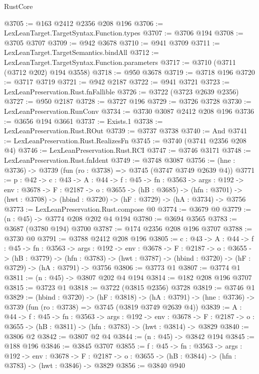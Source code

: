 \begin{lexlean}{RustCore}
\begin{coremodule}
@3705 := @163 @2412 @2356 @208 @196
@3706 := LexLeanTarget.TargetSyntax.Function.types
@3707 := @3706 @194
@3708 := @3705 @3707
@3709 := @942 @3678
@3710 := @941 @3709
@3711 := LexLeanTarget.TargetSemantics.bindAll
@3712 := LexLeanTarget.TargetSyntax.Function.parameters
@3717 := @3710 (@3711 (@3712 @202) @194 @3558)
@3718 := @950 @3678
@3719 := @3718 @196
@3720 := @3717 @3719
@3721 := @942 @2187
@3722 := @941 @3721
@3723 := LexLeanPreservation.Rust.fnFallible
@3726 := @3722 (@3723 @2639 @2356)
@3727 := @950 @2187
@3728 := @3727 @196
@3729 := @3726 @3728
@3730 := LexLeanPreservation.RunConv
@3734 := @3730 @3087 @2412 @208 @196
@3736 := @3656 @194 @3661
@3737 := Exists.{1}
@3738 := LexLeanPreservation.Rust.ROut
@3739 := @3737 @3738
@3740 := And
@3741 := LexLeanPreservation.Rust.RealizesFn
@3745 := @3740 (@3741 @2356 @208 @4)
@3746 := LexLeanPreservation.Rust.RCI
@3747 := @3746 @3171
@3748 := LexLeanPreservation.Rust.fnIdent
@3749 := @3748 @3087
@3756 := (hne : @3736) -> @3739 (fun (ro : @3738) => @3745 (@3747 @3749 @2639 @4))
@3771 := {p : @42} ->
  {c : @43} ->
  {A : @44} ->
  {f : @45} ->
  {fn : @3563} ->
  {args : @192} ->
  {env : @3678} ->
  {F : @2187} ->
  {o : @3655} ->
  (hB : @3685) ->
  (hfn : @3701) -> (hwt : @3708) -> (hbind : @3720) -> (hF : @3729) -> (hA : @3734) -> @3756
@3773 := LexLeanPreservation.Rust.compose @0
@3774 := @3679 @0
@3779 := (n : @45) -> @3774 @208 @202 @4 @194
@3780 := @3694 @3565
@3783 := @3687 (@3780 @194) @3700
@3787 := @174 @2356 @208 @196 @3707
@3788 := @3730 @0
@3791 := @3788 @2412 @208 @196
@3805 := {c : @43} ->
  {A : @44} ->
  {f : @45} ->
  {fn : @3563} ->
  {args : @192} ->
  {env : @3678} ->
  {F : @2187} ->
  {o : @3655} ->
  (hB : @3779) ->
  (hfn : @3783) -> (hwt : @3787) -> (hbind : @3720) -> (hF : @3729) -> (hA : @3791) -> @3756
@3806 := @3773 @1
@3807 := @3774 @1
@3811 := (n : @45) -> @3807 @202 @4 @194
@3814 := @182 @208 @196 @3707
@3815 := @3723 @1
@3818 := @3722 (@3815 @2356) @3728
@3819 := @3746 @1
@3829 := (hbind : @3720) ->
  (hF : @3818) ->
  (hA : @3791) -> (hne : @3736) -> @3739 (fun (ro : @3738) => @3745 (@3819 @3749 @2639 @4))
@3839 := {A : @44} ->
  {f : @45} ->
  {fn : @3563} ->
  {args : @192} ->
  {env : @3678} ->
  {F : @2187} -> {o : @3655} -> (hB : @3811) -> (hfn : @3783) -> (hwt : @3814) -> @3829
@3840 := @3806 @2
@3842 := @3807 @2 @4
@3844 := (n : @45) -> @3842 @194
@3845 := @188 @196
@3846 := @3845 @3707
@3855 := {f : @45} ->
  {fn : @3563} ->
  {args : @192} ->
  {env : @3678} ->
  {F : @2187} -> {o : @3655} -> (hB : @3844) -> (hfn : @3783) -> (hwt : @3846) -> @3829
@3856 := @3840 @940

\end{coremodule}
\end{lexlean}
